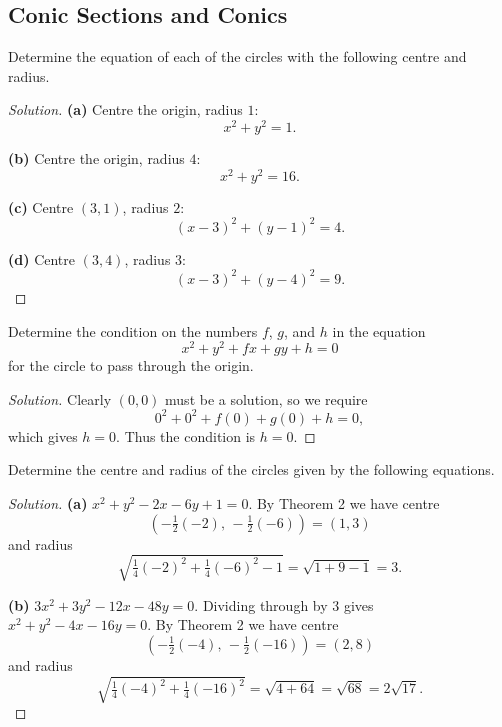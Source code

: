 \subsection{Conic Sections and Conics}

\begin{tcolorbox}[title=Problem 1, breakable]
    Determine the equation of each of the circles with the following centre and radius.
\end{tcolorbox}
\begin{proof}[Solution]
    \textbf{(a)} Centre the origin, radius $1$:
    \[x^2 + y^2 = 1.\]

    \textbf{(b)} Centre the origin, radius $4$:
    \[x^2 + y^2 = 16.\]

    \textbf{(c)} Centre $(3,1)$, radius $2$:
    \[(x-3)^2 + (y-1)^2 = 4.\]

    \textbf{(d)} Centre $(3,4)$, radius $3$:
    \[(x-3)^2 + (y-4)^2 = 9.\]
\end{proof}

\begin{tcolorbox}[title=Problem 2, breakable]
    Determine the condition on the numbers $f$, $g$, and $h$ in the equation
    \[x^2 + y^2 + fx + gy + h = 0\]
    for the circle to pass through the origin.
\end{tcolorbox}
\begin{proof}[Solution]
    Clearly $(0,0)$ must be a solution, so we require
    \[0^2 + 0^2 + f(0) + g(0) + h = 0,\]
    which gives $h = 0$. Thus the condition is $h = 0$.
\end{proof}

\begin{tcolorbox}[title=Problem 3, breakable]
    Determine the centre and radius of the circles given by the following equations.
\end{tcolorbox}
\begin{proof}[Solution]
    \textbf{(a)} $x^2 + y^2 - 2x - 6y + 1 = 0$.
    By Theorem 2 we have centre
    \[\left(-\tfrac{1}{2}(-2),\, -\tfrac{1}{2}(-6)\right) = (1, 3)\]
    and radius
    \[\sqrt{\tfrac{1}{4}(-2)^2 + \tfrac{1}{4}(-6)^2 - 1} = \sqrt{1 + 9 - 1} = 3.\]

    \textbf{(b)} $3x^2 + 3y^2 - 12x - 48y = 0$. Dividing through by $3$ gives $x^2 + y^2 - 4x - 16y = 0$.
    By Theorem 2 we have centre
    \[\left(-\tfrac{1}{2}(-4),\, -\tfrac{1}{2}(-16)\right) = (2, 8)\]
    and radius
    \[\sqrt{\tfrac{1}{4}(-4)^2 + \tfrac{1}{4}(-16)^2} = \sqrt{4 + 64} = \sqrt{68} = 2\sqrt{17}.\]
\end{proof}

